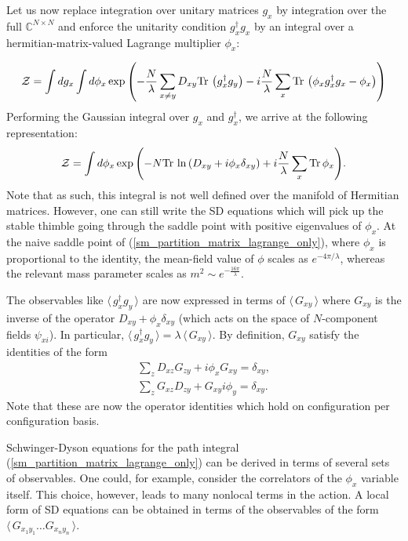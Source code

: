 \documentclass[twocolumn,showpacs,preprintnumbers,superscriptaddress,amsmath,floatfix,amssymb,secnumarabic]{revtex4}
\newcommand{\lr}[1]{ \left( #1 \right) }
\newcommand{\vev}[1]{ \langle \, #1 \, \rangle }
\newcommand{\tr}{ {\rm Tr} \, }
\newcommand{\expa}[1]{ \exp{\left( #1 \right)} }
\begin{document}
Let us now replace integration over unitary matrices $g_x$ by integration over the full $\mathbb{C}^{N \times N}$ and enforce the unitarity condition $g^{\dag}_x g_x$ by an integral over a hermitian-matrix-valued Lagrange multiplier $\phi_x$:
\begin{widetext}
\begin{eqnarray}
\label{sm_partition_matrix_lagrange}
 \mathcal{Z} = \int dg_x \int d\phi_x \expa{ - \frac{N}{\lambda} \sum\limits_{x \neq y} D_{xy} \tr\lr{g^{\dag}_x g_y} - i \frac{N}{\lambda} \sum\limits_x \tr\lr{\phi_x  g^{\dag}_x g_x - \phi_x} }
\end{eqnarray}
Performing the Gaussian integral over $g_x$ and $g^{\dag}_x$, we arrive at the following representation:
\begin{eqnarray}
\label{sm_partition_matrix_lagrange_only}
 \mathcal{Z} = \int d\phi_x
 \expa{- N \tr\ln\lr{D_{xy} + i \phi_x \delta_{xy}} + i \frac{N}{\lambda} \sum\limits_x \tr \phi_x } .
\end{eqnarray}
Note that as such, this integral is not well defined over the manifold of Hermitian matrices. However, one can still write the SD equations which will pick up the stable thimble going through the saddle point with positive eigenvalues of $\phi_x$. At the naive saddle point of (\ref{sm_partition_matrix_lagrange_only}), where $\phi_x$ is proportional to the identity, the mean-field value of $\phi$ scales as $e^{-4 \pi/\lambda}$, whereas the relevant mass parameter scales as $m^2 \sim e^{-\frac{16 \pi}{\lambda}}$.
\end{widetext}

 The observables like $\vev{g^{\dag}_x g_y }$ are now expressed in terms of $\vev{G_{xy}}$ where $G_{xy}$ is the inverse of the operator $D_{xy} + \phi_x \delta_{xy}$ (which acts on the space of $N$-component fields $\psi_{x i}$). In particular, $\vev{g^{\dag}_x g_y } = \lambda \, \vev{G_{xy}}$. By definition, $G_{xy}$ satisfy the identities of the form
\begin{eqnarray}
\label{G_identities}
 \sum\limits_z D_{xz} G_{zy} + i \phi_x G_{xy} = \delta_{x y} ,
 \nonumber \\
 \sum\limits_z G_{xz} D_{zy} + G_{xy} i \phi_y = \delta_{x y} .
\end{eqnarray}
Note that these are now the operator identities which hold on configuration per configuration basis.

 Schwinger-Dyson equations for the path integral (\ref{sm_partition_matrix_lagrange_only}) can be derived in terms of several sets of observables. One could, for example, consider the correlators of the $\phi_x$ variable itself. This choice, however, leads to many nonlocal terms in the action. A local form of SD equations can be obtained in terms of the observables of the form $\vev{G_{x_1 y_1} \ldots G_{x_n y_n}}$.
\end{document}
